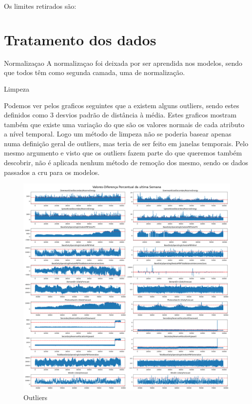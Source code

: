 Os limites retirados são:




\section{Tratamento dos dados  \label{se:data_treatment}}

Normalizaçao
A normalizaçao foi deixada por ser aprendida nos modelos, sendo que todos têm como segunda camada, uma de normalização.

Limpeza

Podemos ver pelos graficos seguintes que a existem alguns outliers, sendo estes definidos como 3 desvios padrão de distância à média.
Estes graficos mostram também que existe uma variação do que são os valores normais de cada atributo a nível temporal. Logo um método de limpeza não se poderia basear apenas numa definição geral de outliers, mas teria de ser feito em janelas temporais.
Pelo mesmo argumento e visto que os outliers fazem parte do que queremos também descobrir, não é aplicada nenhum método de remoção dos mesmo, sendo os dados passados a cru para os modelos.


\begin{figure}[H]
  \centering
  \includegraphics[width=\textwidth]{../plots/Outliers_3stds.png}
  \caption{Outliers}
\end{figure}

